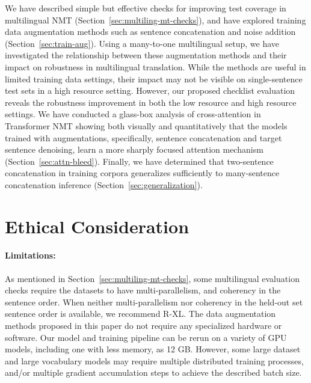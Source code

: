 We have described simple but effective checks for improving test coverage in multilingual NMT (Section~\ref{sec:multiling-mt-checks}), and have explored training data augmentation methods such as sentence concatenation and noise addition (Section~\ref{sec:train-aug}).
Using a many-to-one multilingual setup, we have investigated the relationship between these augmentation methods and their impact on robustness in multilingual translation. 
While the methods are useful in limited training data settings, their impact may not be visible on single-sentence test sets in a high resource setting. 
However, our proposed checklist evaluation reveals the robustness improvement in both the low resource and high resource settings.
We have conducted a glass-box analysis of cross-attention in Transformer NMT showing both visually and quantitatively that the models trained with augmentations, specifically, sentence concatenation and target sentence denoising, learn a more sharply focused attention mechanism (Section~\ref{sec:attn-bleed}).
Finally, we have determined that two-sentence concatenation in training corpora generalizes sufficiently to many-sentence concatenation inference (Section~\ref{sec:generalization}).  


\section*{Ethical Consideration}


\paragraph{Limitations:} As mentioned in Section~\ref{sec:multiling-mt-checks}, some multilingual evaluation checks require the datasets to have multi-parallelism, and coherency in the sentence order.
When neither multi-parallelism nor coherency in the held-out set sentence order is available, we recommend R-XL. 
The data augmentation methods proposed in this paper do not require any specialized hardware or software.
Our model and training pipeline can be rerun on a variety of GPU models, including one with less memory, as 12 GB. 
However, some large dataset and large vocabulary models may require multiple distributed training processes, and/or multiple gradient accumulation steps to achieve the described batch size.

